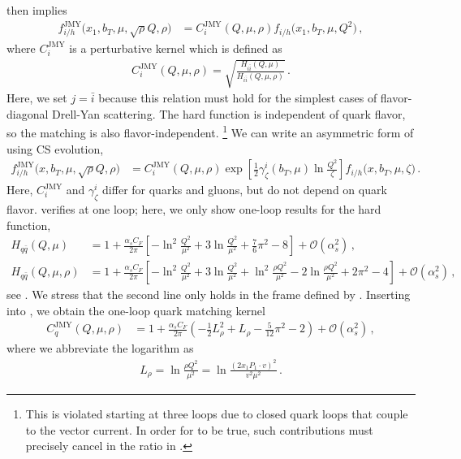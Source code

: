 \documentclass[11pt,a4paper]{article}
\newcommand{\cO}{\mathcal{O}}
\newcommand{\nn}{\nonumber}
\newcommand{\as}{\alpha_s}
\newcommand{\JMY}{\mathrm{JMY}}
\begin{document}
 then implies
\begin{align} \label{eq:tmd_scheme_relations_1}
	f^\JMY_{i/h}\bigl(x_1, b_T, \mu, \sqrt{\rho} Q, \rho\bigr) &
	= C_i^\JMY(Q, \mu, \rho) f_{i/h}\bigl(x_1, b_T, \mu, Q^2 \bigr)
	\,,\end{align}
where $C_i^\JMY$ is a perturbative kernel which is defined as
\begin{align} \label{eq:jmy_kernel}
 C_i^\JMY(Q, \mu, \rho) = \sqrt{\frac{H_{i\bar i}(Q, \mu)}{H_{i\bar i}(Q, \mu, \rho)}}
\,.\end{align}
Here, we set $j = \bar i$ because this relation must hold for the simplest cases of flavor-diagonal Drell-Yan scattering. The hard function is independent of quark flavor, so
the matching is also flavor-independent.%
\footnote{This is violated starting at three loops due to closed quark loops
	that couple to the vector current. In order for  to be true,
	such contributions must precisely cancel in the ratio in .}
We can write an asymmetric form of  using CS evolution,
\begin{align} \label{eq:tmd_scheme_relations_2}
	f^\JMY_{i/h}\bigl(x, b_T, \mu, \sqrt{\rho} Q, \rho\bigr) &
	= C_i^\JMY(Q, \mu, \rho)
	\exp\left[ \frac12 \gamma_\zeta^i(b_T, \mu) \ln\frac{Q^2}{\zeta}\right]
	f_{i/h}\bigl(x, b_T, \mu, \zeta\bigr)
	\,.\end{align}
Here, $C_i^\JMY$ and $\gamma_\zeta^i$ differ for quarks and gluons,
but do not depend on quark flavor.
%
 verifies  at one loop;
here, we only show one-loop results for the hard function,
\begin{align} \label{eq:hard_funcs}
	H_{q \bar q}(Q, \mu) &
	= 1 + \frac{\as C_F}{2\pi}
	\left[ - \ln^2\frac{Q^2}{\mu^2} + 3 \ln\frac{Q^2}{\mu^2} + \frac76 \pi^2 - 8 \right] + \cO(\as^2)
	\,,\\\nn
	H_{q \bar q}(Q, \mu, \rho) &
	= 1 + \frac{\as C_F}{2\pi}
	\left[ - \ln^2\frac{Q^2}{\mu^2} + 3 \ln\frac{Q^2}{\mu^2} + \ln^2\frac{\rho Q^2}{\mu^2} - 2 \ln\frac{\rho Q^2}{\mu^2}  + 2 \pi^2 - 4\right]
	+ \cO(\as^2)
	\,,\end{align}
see .
We stress that the second line only holds in the frame defined by .
Inserting  into , we obtain the one-loop quark matching kernel
\begin{align} \label{eq:matching_JMY}
	C_q^\JMY(Q, \mu, \rho) &
	= 1 + \frac{\as C_F}{2\pi} \left( -  \frac12 L_\rho^2 + L_\rho - \frac{5}{12} \pi^2 - 2 \right) + \cO(\as^2)
	\,,\end{align}
where we abbreviate the logarithm as
\begin{align} \label{eq:matching_JMY_log}
 L_\rho
 = \ln\frac{\rho Q^2}{\mu^2}
 = \ln \frac{(2 x_1 P_1 \cdot v)^2}{v^2 \mu^2}
\,.\end{align}
\end{document}
